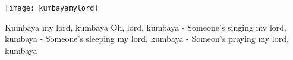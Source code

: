 \begin{intersong}
    \texttt{[image: kumbayamylord]}
\end{intersong}
\beginverse*
Kumbaya my lord, kumbaya 
Oh, lord, kumbaya 
\endverse
\beginchorus
-	Someone’s singing my lord, kumbaya 
-	Someone’s sleeping my lord, kumbaya	
-	Someon’s praying my lord, kumbaya	

\endchorus
\endsong 